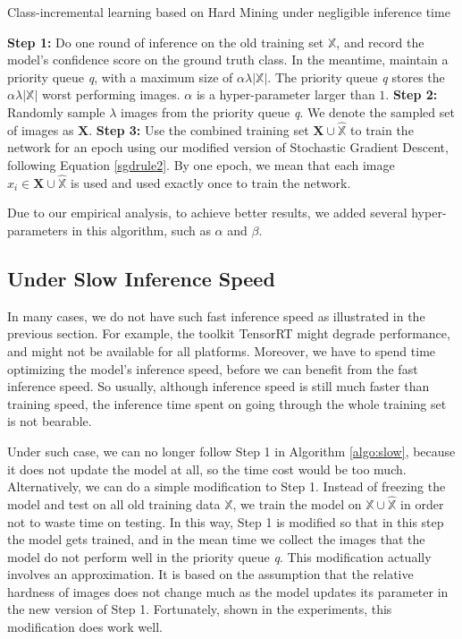 \begin{algorithm}
\caption{Class-incremental learning based on Hard Mining under negligible inference time}
\label{algo:fast}
	\begin{algorithmic}
		\State \textbf{Step 1:} Do one round of inference on the old training set $\mathbb{X}$, and record the model's confidence score on the ground truth class. In the meantime, maintain a priority queue \textit{q}, with a maximum size of $\alpha \lambda |\mathbb{X}|$. The priority queue \textit{q} stores the $\alpha \lambda |\mathbb{X}|$ worst performing images. $\alpha$ is a hyper-parameter larger than $1$.
		\State \textbf{Step 2:} Randomly sample $\lambda$ images from the priority queue \textit{q}. We denote the sampled set of images as $\mathbf{X}$. 
		\State \textbf{Step 3:} Use the combined training set $\mathbf{X} \cup \hat{\mathbb{X}}$ to train the network for an epoch using our modified version of Stochastic Gradient Descent, following Equation \ref{sgdrule2}. By one epoch, we mean that each image $x_i \in \mathbf{X} \cup \hat{\mathbb{X}}$ is used and used exactly once to train the network.
		\EndFor
	\end{algorithmic}
\end{algorithm}
Due to our empirical analysis, to achieve better results, we added several hyper-parameters in this algorithm, such as $\alpha$ and $\beta$. 

\subsection{Under Slow Inference Speed}

In many cases, we do not have such fast inference speed as illustrated in the previous section. For example, the toolkit TensorRT might degrade performance, and might not be available for all platforms. Moreover, we have to spend time optimizing the model's inference speed, before we can benefit from the fast inference speed. So usually, although inference speed is still much faster than training speed, the inference time spent on going through the whole training set is not bearable.

Under such case, we can no longer follow Step 1 in Algorithm \ref{algo:slow}, because it does not update the model at all, so the time cost would be too much. Alternatively, we can do a simple modification to Step 1. Instead of freezing the model and test on all old training data $\mathbb{X}$, we train the model on $\mathbb{X}\cup \hat{\mathbb{X}}$ in order not to waste time on testing. In this way, Step 1 is modified so that in this step the model gets trained, and in the mean time we collect the images that the model do not perform well in the priority queue \textit{q}. This modification actually involves an approximation. It is based on the assumption that the relative hardness of images does not change much as the model updates its parameter in the new version of Step 1. Fortunately, shown in the experiments, this modification does work well.

